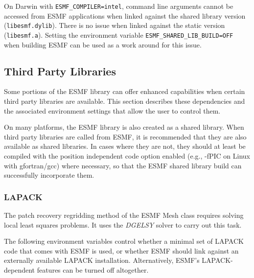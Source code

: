 On Darwin with {\tt ESMF\_COMPILER=intel}, command line arguments cannot be
accessed from ESMF applications when linked against the shared library version
({\tt libesmf.dylib}). There is no issue when linked against the static
version ({\tt libesmf.a}). Setting the environment variable
{\tt ESMF\_SHARED\_LIB\_BUILD=OFF} when building ESMF can be used as a
work around for this issue.

\subsection{Third Party Libraries}
\label{sec:ThirdParty}

Some portions of the ESMF library can offer enhanced capabilities when
certain third party libraries are available. This section describes
these dependencies and the associated environment settings
that allow the user to control them.

On many platforms, the ESMF library is also created as a shared library.
When third party libraries are called from ESMF, it is recommended that they are
also available as shared libraries.  In cases where they are not, they should at
least be compiled with the position independent code option enabled (e.g., -fPIC on
Linux with gfortran/gcc) where necessary, so that the ESMF shared library
build can successfully incorporate them.

\subsubsection{LAPACK}
\label{sec:lapack}
The patch recovery regridding method of the ESMF Mesh class requires solving
local least squares problems. It uses the
 {\it DGELSY} solver
to carry out this task.

The following environment variables control whether a minimal set of
LAPACK code that comes with ESMF is used, or whether ESMF should link against
an externally available LAPACK installation. Alternatively, ESMF's
LAPACK-dependent features can be turned off altogether.

